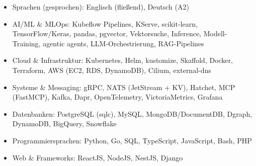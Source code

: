 \documentclass[10pt,a4paper]{resume}
\begin{document}
\begin{itemize}[leftmargin=1.4em,nosep,topsep=2pt]
  \item Sprachen (gesprochen): Englisch (fließend), Deutsch (A2)
  \item AI/ML \& MLOps: Kubeflow Pipelines, KServe, scikit-learn, TensorFlow/Keras, pandas, pgvector, Vektorsuche, Inference, Modell-Training, agentic agents, LLM-Orchestrierung, RAG-Pipelines
  \item Cloud \& Infrastruktur: Kubernetes, Helm, kustomize, Skaffold, Docker, Terraform, AWS (EC2, RDS, DynamoDB), Cilium, external-dns
  \item Systeme \& Messaging: gRPC, NATS (JetStream + KV), Hatchet, MCP (FastMCP), Kafka, Dapr, OpenTelemetry, VictoriaMetrics, Grafana
  \item Datenbanken: PostgreSQL (sqlc), MySQL, MongoDB/DocumentDB, Dgraph, DynamoDB, BigQuery, Snowflake
  \item Programmiersprachen: Python, Go, SQL, TypeScript, JavaScript, Bash, PHP
  \item Web \& Frameworks: ReactJS, NodeJS, NestJS, Django
\end{itemize}
\end{document}
